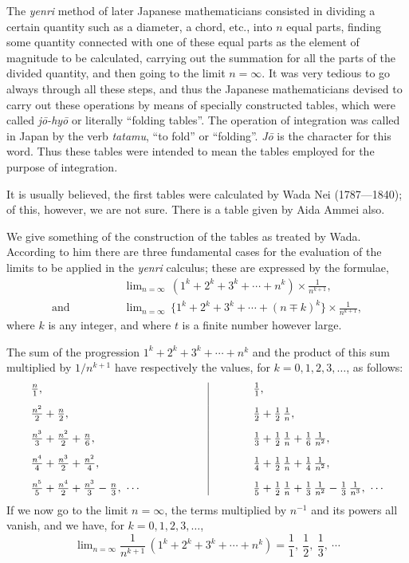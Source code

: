 \documentclass[11pt]{article}
\newcommand{\scanpage}[2]{\clearpage\setcounter{footnote}{0}\noindent{\footnotesize\color{gray}PDF page #1 · #2}\par\medskip}
\begin{document}
The \emph{yenri} method of later Japanese mathematicians consisted in dividing a certain quantity such as a diameter, a chord, etc., into $n$ equal parts, finding some quantity connected with one of these equal parts as the element of magnitude to be calculated, carrying out the summation for all the parts of the divided quantity, and then going to the limit $n = \infty$. It was very tedious to go always through all these steps, and thus the Japanese mathematicians devised to carry out these operations by means of specially constructed tables, which were called \emph{jō-hyō} or literally ``folding tables''. The operation of integration was called in Japan by the verb \emph{tatamu}, ``to fold'' or ``folding''. \emph{Jō} is the character for this word. Thus these tables were intended to mean the tables employed for the purpose of integration.

\scanpage{0283}{printed page 269}
It is usually believed, the first tables were calculated by Wada Nei (1787---1840); of this, however, we are not sure. There is a table given by Aida Ammei also.

We give something of the construction of the tables as treated by Wada. According to him there are three fundamental cases for the evaluation of the limits to be applied in the \emph{yenri} calculus; these are expressed by the formulae,
\begin{align*}
&\lim\nolimits_{n=\infty}\,(1^k+2^k+3^k+\cdots+n^k)\times\frac{1}{n^{k+1}},\\
\text{and}\qquad\qquad&\lim\nolimits_{n=\infty}\,\{1^k+2^k+3^k+\cdots+(n\mp k)^k\}\times\frac{1}{n^{k+1}},
\end{align*}
where $k$ is any integer, and where $t$ is a finite number however large.

The sum of the progression $1^k+2^k+3^k+\cdots+n^k$ and the product of this sum multiplied by $1/n^{k+1}$ have respectively the values, for $k=0, 1, 2, 3, \ldots$, as follows:
\[
\begin{array}{l@{\hspace{6em}}|@{\hspace{4em}}l}
\frac{n}{1}, & \frac{1}{1},\\[3mm]
\frac{n^2}{2}+\frac{n}{2}, & \frac{1}{2}+\frac{1}{2}\,\frac{1}{n},\\[3mm]
\frac{n^3}{3}+\frac{n^2}{2}+\frac{n}{6}, & \frac{1}{3}+\frac{1}{2}\,\frac{1}{n}+\frac{1}{6}\,\frac{1}{n^2},\\[3mm]
\frac{n^4}{4}+\frac{n^3}{2}+\frac{n^2}{4}, & \frac{1}{4}+\frac{1}{2}\,\frac{1}{n}+\frac{1}{4}\,\frac{1}{n^2},\\[3mm]
\frac{n^5}{5}+\frac{n^4}{2}+\frac{n^3}{3}-\frac{n}{3},\ \cdots & \frac{1}{5}+\frac{1}{2}\,\frac{1}{n}+\frac{1}{3}\,\frac{1}{n^2}-\frac{1}{3}\,\frac{1}{n^3},\ \cdots
\end{array}
\]
If we now go to the limit $n=\infty$, the terms multiplied by $n^{-1}$ and its powers all vanish, and we have, for $k=0, 1, 2, 3, \ldots$,
\[
\lim\nolimits_{n=\infty}\frac{1}{n^{k+1}}\,(1^k+2^k+3^k+\cdots+n^k)=\frac{1}{1},\ \frac{1}{2},\ \frac{1}{3},\ \cdots
\]
\end{document}

